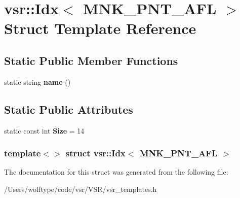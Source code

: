 \hypertarget{structvsr_1_1_idx_3_01_m_n_k___p_n_t___a_f_l_01_4}{\section{vsr\-:\-:Idx$<$ M\-N\-K\-\_\-\-P\-N\-T\-\_\-\-A\-F\-L $>$ Struct Template Reference}
\label{structvsr_1_1_idx_3_01_m_n_k___p_n_t___a_f_l_01_4}
}
\subsection*{Static Public Member Functions}
\begin{DoxyCompactItemize}
\item 
\hypertarget{structvsr_1_1_idx_3_01_m_n_k___p_n_t___a_f_l_01_4_a0d3249adcc4413d0abbf2db922bacd71}{static string {\bfseries name} ()}\label{structvsr_1_1_idx_3_01_m_n_k___p_n_t___a_f_l_01_4_a0d3249adcc4413d0abbf2db922bacd71}

\end{DoxyCompactItemize}
\subsection*{Static Public Attributes}
\begin{DoxyCompactItemize}
\item 
\hypertarget{structvsr_1_1_idx_3_01_m_n_k___p_n_t___a_f_l_01_4_a1f35442677f14d37863ca722f6a67d68}{static const int {\bfseries Size} = 14}\label{structvsr_1_1_idx_3_01_m_n_k___p_n_t___a_f_l_01_4_a1f35442677f14d37863ca722f6a67d68}

\end{DoxyCompactItemize}
\subsubsection*{template$<$$>$ struct vsr\-::\-Idx$<$ M\-N\-K\-\_\-\-P\-N\-T\-\_\-\-A\-F\-L $>$}



The documentation for this struct was generated from the following file\-:\begin{DoxyCompactItemize}
\item 
/\-Users/wolftype/code/vsr/\-V\-S\-R/vsr\-\_\-templates.\-h\end{DoxyCompactItemize}
